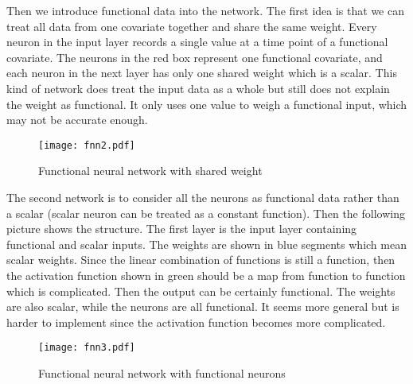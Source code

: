 Then we introduce functional data into the network. The first idea is that we can treat all data from one covariate together and share the same weight. Every neuron in the input layer records a single value at a time point of a functional covariate. The neurons in the red box represent one functional covariate, and each neuron in the next layer has only one shared weight which is a scalar. This kind of network does treat the input data as a whole but still does not explain the weight as functional. It only uses one value to weigh a functional input, which may not be accurate enough.
\begin{figure}[H] %
\centering %
\texttt{[image: fnn2.pdf]} %
\caption{Functional neural network with shared weight} %
\label{fig: fnn2} %
\end{figure}
The second network is to consider all the neurons as functional data rather than a scalar (scalar neuron can be treated as a constant function). Then the following picture shows the structure. The first layer is the input layer containing functional and scalar inputs. The weights are shown in blue segments which mean scalar weights. Since the linear combination of functions is still a function, then the activation function shown in green should be a map from function to function which is complicated. Then the output can be certainly functional. The weights are also scalar, while the neurons are all functional. It seems more general but is harder to implement since the activation function becomes more complicated.
\begin{figure}[H] %
\centering %
\texttt{[image: fnn3.pdf]} %
\caption{Functional neural network with functional neurons} %
\label{fig: fnn3} %
\end{figure}

